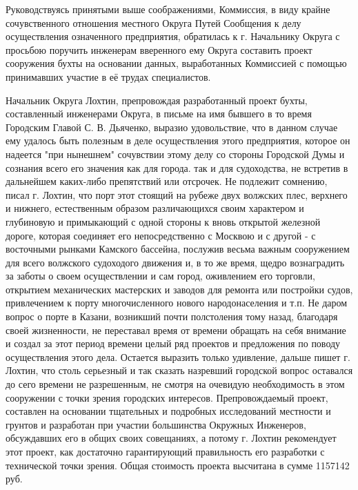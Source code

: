 \documentclass[oneside,final,14pt]{extreport}
\begin{document}
Руководствуясь принятыми выше соображениями, Коммиссия, в виду крайне сочувственного отношения местного Округа Путей Сообщения к делу осуществления означенного предприятия, обратилась к г. Начальнику Округа с просьбою поручить инженерам вверенного ему Округа составить проект сооружения бухты на основании данных, выработанных Коммиссией с помощью принимавших участие в её трудах специалистов.

Начальник Округа Лохтин, препровождая разработанный проект бухты, составленный инженерами Округа, в письме на имя бывшего в то время Городским Главой С. В. Дьяченко, выразио удовольствие, что в данном случае ему удалось быть полезным в деле осуществления этого предприятия, которое он надеется "при нынешнем" сочувствии этому делу со стороны Городской Думы и сознания всего его значения как для города. так и для судоходства, не встретив в дальнейшем каких-либо препятствий или отсрочек. Не подлежит сомнению, писал г. Лохтин, что порт этот стоящий на рубеже двух волжских плес, верхнего и нижнего, естественным образом различающихся своим характером и глубиновую и примыкающий с одной стороны к вновь открытой железной дороге, которая соединяет его непосредственно с Москвою и с другой - с восточными рынками Камского бассейна, послужив весьма важным сооружением для всего волжского судоходого движения и, в то же время, щедро вознаградить за заботы о своем осуществлении и сам город, оживлением его торговли, открытием механических мастерских и заводов для ремонта или постройки судов, привлечением к порту многочисленного нового народонаселения и т.п. Не даром вопрос о порте в Казани, возникший почти полстоления тому назад, благодаря своей жизненности, не переставал время от времени обращать на себя внимание и создал за этот период времени целый ряд проектов и предложения по поводу осуществления этого дела. Остается выразить только удивление, дальше пишет г. Лохтин, что столь серьезный и так сказать назревший городской вопрос оставался до сего времени не разрешенным, не смотря на очевидую необходимость в этом сооружении с точки зрения городских интересов. Препровождаемый проект, составлен на основании тщательных и подробных исследований местности и грунтов и разработан при участии большинства Окружных Инженеров, обсуждавших его в общих своих совещаниях, а потому г. Лохтин рекомендует этот проект, как достаточно гарантирующий правильность его разработки с технической точки зрения. Общая стоимость проекта высчитана в сумме 1157142 руб.
\end{document}

